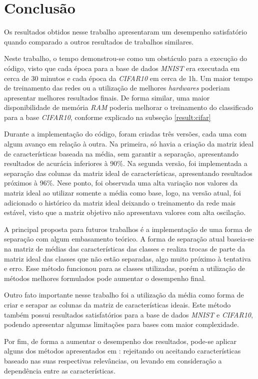 \documentclass[conference]{IEEEtran}
\begin{document}
\section{Conclusão} \label{Concl}

Os resultados obtidos nesse trabalho apresentaram um desempenho satisfatório quando comparado a outros resultados de trabalhos similares.

Neste trabalho, o tempo demonstrou-se como um obstáculo para a execução do código, visto que cada época para a base de dados \textit{MNIST} era executada em cerca de 30 minutos e cada época da \textit{CIFAR10} em cerca de 1h. Um maior tempo de treinamento das redes ou a utilização de melhores \textit{hardwares} poderiam apresentar melhores resultados finais. De forma similar, uma maior disponibilidade de memória \textit{RAM} poderia melhorar o treinamento do classificado para a base \textit{CIFAR10}, conforme explicado na subseção \ref{result:cifar}

Durante a implementação do código, foram criadas três versões, cada uma com algum avanço em relação à outra. Na primeira, só havia a criação da matriz ideal de características baseada na média, sem garantir a separação, apresentando resultados de acurácia inferiores à 90\%. Na segunda versão, foi implementada a separação das colunas da matriz ideal de características, apresentando resultados próximos à 96\%. Nese ponto, foi observada uma alta variação nos valores da matriz ideal ao utilizar somente a média como base, logo, na versão atual, foi adicionado o histórico da matriz ideal deixando o treinamento da rede mais estável, visto que a matriz objetivo não apresentava valores com alta oscilação.

A principal proposta para futuros trabalhos é a implementação de uma forma de separação com algum embasamento teórico. A forma de separação atual baseia-se na matriz de médias das características das classes e realiza trocas de parte da matriz ideal das classes que não estão separadas, algo muito próximo à tentativa e erro. Esse método funcionou para as classes utilizadas, porém a utilização de métodos melhores formulados pode aumentar o desempenho final.

Outro fato importante nesse trabalho foi a utilização da média como forma de criar e serapar as colunas da matriz de características ideais. Este método também possui resultados satisfatórios para a base de dados \textit{MNIST} e \textit{CIFAR10}, podendo apresentar algumas limitações para bases com maior complexidade.

Por fim, de forma a aumentar o desempenho dos resultados, pode-se aplicar alguns dos métodos apresentados em \cite{ftguyon}: rejeitando ou aceitando características baseado nas suas respectivas relevâncias, ou levando em consideração a dependência entre as características.




 \label{Ref}
\end{document}
